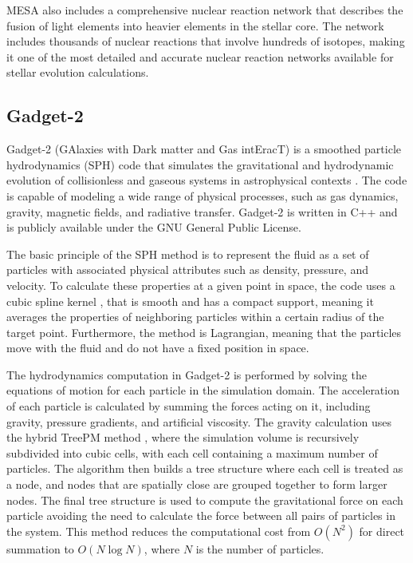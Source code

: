 MESA also includes a comprehensive nuclear reaction network that describes the fusion of light elements into heavier elements in the stellar core. The network includes thousands of nuclear reactions that involve hundreds of isotopes, making it one of the most detailed and accurate nuclear reaction networks available for stellar evolution calculations.


\subsection{Gadget-2}

Gadget-2 (GAlaxies with Dark matter and Gas intEracT) is a smoothed particle hydrodynamics (SPH) code that simulates the gravitational and hydrodynamic evolution of collisionless and gaseous systems in astrophysical contexts \citep{springel2005cosmological}. The code is capable of modeling a wide range of physical processes, such as gas dynamics, gravity, magnetic fields, and radiative transfer. Gadget-2 is written in C++ and is publicly available under the GNU General Public License.

The basic principle of the SPH method is to represent the fluid as a set of particles with associated physical attributes such as density, pressure, and velocity. To calculate these properties at a given point in space, the code uses a cubic spline kernel \citep{monaghan1985refined}, that is smooth and has a compact support, meaning it averages the properties of neighboring particles within a certain radius of the target point. Furthermore, the method is Lagrangian, meaning that the particles move with the fluid and do not have a fixed position in space.


The hydrodynamics computation in Gadget-2 is performed by solving the equations of motion for each particle in the simulation domain. The acceleration of each particle is calculated by summing the forces acting on it, including gravity, pressure gradients, and artificial viscosity. The gravity calculation uses the hybrid TreePM method \citep{bode2000tree,bagla2002treepm}, where the simulation volume is recursively subdivided into cubic cells, with each cell containing a maximum number of particles. The algorithm then builds a tree structure where each cell is treated as a node, and nodes that are spatially close are grouped together to form larger nodes. The final tree structure is used to compute the gravitational force on each particle avoiding the need to calculate the force between all pairs of particles in the system. This method reduces the computational cost from $O(N^2)$ for direct summation to $O(N\log N)$, where $N$ is the number of particles.


